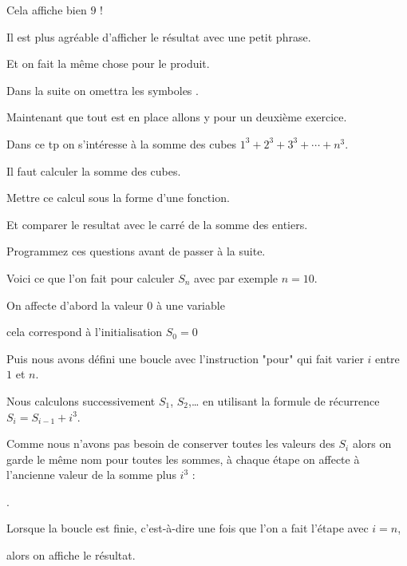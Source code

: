 \change

Cela affiche bien $9$ !


\change

Il est plus agréable d'afficher le résultat avec une petit phrase.

\change

\change


Et on fait la même chose pour le produit.


\change

\change


Dans la suite on omettra les symboles \codeinline{>>>}. 


\diapo

Maintenant que tout est en place allons y pour un deuxième exercice.

Dans ce  tp on s’intéresse à la somme des cubes $1^3+2^3+3^3+ \cdots + n^3$.

Il faut calculer la somme des cubes.

Mettre ce calcul sous la forme d'une fonction.

Et comparer le resultat avec le carré de la somme des entiers.

Programmez ces questions avant de passer à la suite.



\diapo


Voici ce que l'on fait pour calculer $S_n$ avec par exemple $n = 10$. 

On affecte d'abord la valeur $0$ à une variable 

cela correspond à l'initialisation $S_0=0$

Puis nous avons défini une boucle
avec l'instruction "pour" qui fait varier $i$ entre $1$ et $n$.

Nous calculons successivement $S_1$, $S_2$,\ldots 
en utilisant la formule de récurrence
$S_{i}= S_{i-1}+i^3$. 

Comme nous n'avons pas besoin de conserver toutes les valeurs des $S_i$ alors on garde
le même nom pour toutes les sommes, à chaque étape on affecte à 
 l'ancienne valeur de la somme plus $i^3$ :

.

Lorsque la boucle est finie, c'est-à-dire une fois que l'on a fait l'étape avec $i=n$,

alors on affiche le résultat.

